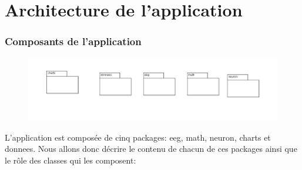 \part{Architecture de l'application} %
\label{prt:architecture_ _de_ _l_'_application_}
	
	\section{Composants de l'application} %
	\label{sec:composant_de_l_application}
	\begin{figure}[h!]
			\centering
		    \includegraphics []{../diagramme_classes/packages.png} \\
			\label{fig_pack}
	\end{figure}
	L'application est composée de cinq packages: eeg, math, neuron, charts et donnees. Nous allons donc décrire le contenu de chacun de ces packages ainsi que le rôle des classes qui les composent:
